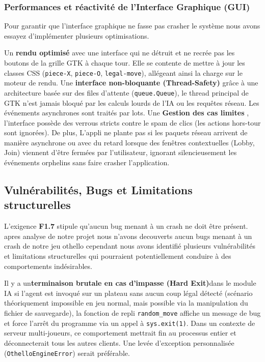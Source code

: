 \documentclass[a4paper]{article}
\begin{document}
\subsubsection{Performances et réactivité de l'Interface Graphique (GUI)}
Pour garantir que l'interface graphique ne fasse pas crasher le système nous avons essayez d'implémenter plusieurs optimisations.

Un \textbf{rendu optimisé} avec une interface qui ne détruit et ne recrée pas les boutons de la grille GTK à chaque tour. Elle se contente de mettre 
à jour les classes CSS (\texttt{piece-X}, \texttt{piece-O}, \texttt{legal-move}), allégeant ainsi la charge sur le moteur de rendu.
Une \textbf{interface non-bloquante (Thread-Safety)} grâce à une architecture basée sur des files d'attente (\texttt{queue.Queue}), 
le thread principal de GTK n'est jamais bloqué par les calculs lourds de l'IA ou les requêtes réseau. Les événements asynchrones sont traités par lots.
Une \textbf{Gestion des cas limites }, l'interface possède des verrous stricts contre le spam de clics (les actions hors-tour sont ignorées). 
De plus, L'appli ne plante pas si les paquets réseau arrivent de manière asynchrone ou avec du retard lorsque des fenêtres contextuelles (Lobby, Join) 
viennent d'être fermées par l'utilisateur, ignorant silencieusement les événements orphelins sans faire crasher l'application.


\subsection{Vulnérabilités, Bugs et Limitations structurelles}

L'exigence \textbf{F1.7} stipule qu'aucun bug menant à un crash ne doit être présent. apres analyse de notre projet nous n'avons decouverts aucun bugs menant à un crash de notre jeu othello cependant nous avons identifié plusieurs vulnérabilités et limitations structurelles qui pourraient potentiellement conduire à des comportements indésirables.

Il y a un\textbf{terminaison brutale en cas d'impasse (Hard Exit)}dans le module IA si l'agent est invoqué sur un plateau sans aucun coup légal détecté 
(scénario théoriquement impossible en jeu normal, mais possible via la manipulation du fichier de sauvegarde), la fonction de repli \texttt{random\_move} 
affiche un message de bug et force l'arrêt du programme via un appel à \texttt{sys.exit(1)}. Dans un contexte de serveur multi-joueurs, 
ce comportement mettrait fin au processus entier et déconnecterait tous les autres clients. Une levée d'exception personnalisée (\texttt{OthelloEngineError}) 
serait préférable.
\end{document}
